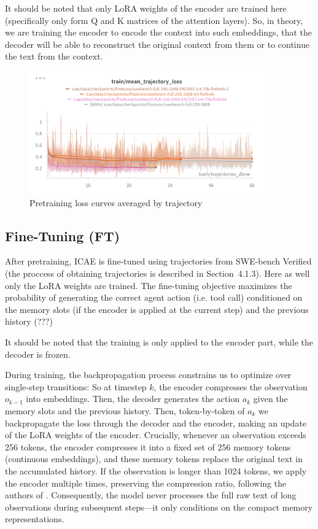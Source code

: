 It should be noted that only LoRA weights of the encoder are trained here (specifically only form Q and K matrices of the attention layers).
So, in theory, we are training the encoder to encode the context into such embeddings, that the decoder will be able to reconstruct the original context from them or to continue the text from the context.

\begin{figure}[hbt]
  \centering
  \includegraphics[width=0.9\textwidth]{graphs/pt_losses.png}
  \caption{Pretraining loss curves averaged by trajectory}
  \label{fig:pt_losses}
\end{figure}

\subsection{Fine-Tuning (FT)}
After pretraining, ICAE is fine-tuned using trajectories from SWE-bench Verified (the proccess of obtaining trajectories is described in Section~4.1.3).
Here as well only the LoRA weights are trained.
The fine-tuning objective maximizes the probability of generating the correct agent action (i.e. tool call) conditioned on the memory slots (if the encoder is applied at the current step) and the previous history (???)

It should be noted that the training is only applied to the encoder part, while the decoder is frozen.


During training, the backpropagation process constrains us to optimize over single-step transitions:
So at timestep \(k\), the encoder compresses the observation \(o_{k-1}\) into embeddings. Then, the decoder generates the action \(a_k\) given the memory slots and the previous history.
Then, token-by-token of \(a_k\) we backpropagate the loss through the decoder and the encoder, making an update of the LoRA weights of the encoder.
Crucially, whenever an observation exceeds 256 tokens, the encoder compresses it into a fixed set of 256 memory tokens (continuous embeddings), and these memory tokens replace the original text in the accumulated history.
If the observation is longer than 1024 tokens, we apply the encoder multiple times, preserving the compression ratio, following the authors of \cite{ge_context_2024}.
Consequently, the model never processes the full raw text of long observations during subsequent steps—it only conditions on the compact memory representations.

